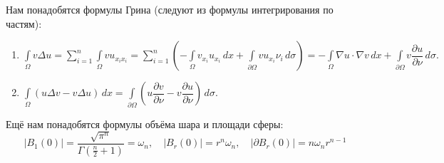 Нам понадобятся формулы Грина (следуют из формулы интегрирования по частям):
\begin{enumerate}
\item $\displaystyle \int \limits_\Omega v \Delta u = \sum \limits_{i = 1}^{n} \int \limits_\Omega v u_{x_i x_i} = \sum \limits_{i = 1}^{n} \left( - \int \limits_\Omega v_{x_i} u_{x_i} \, dx + \int \limits_{\partial \Omega} v u_{x_i} \nu_i \, d\sigma \right) = - \int \limits_\Omega \nabla u \cdot \nabla v \, dx + \int \limits_{\partial \Omega} v \dfrac{\partial u}{\partial \nu} \, d\sigma.$
\item $\displaystyle \int \limits_{\Omega} \left( u \Delta v - v \Delta u \right) \, dx = \int \limits_{\partial \Omega} \left( u \dfrac{\partial v}{\partial \nu} - v \dfrac{\partial u}{\partial \nu} \right) \, d\sigma.$
\end{enumerate}
Ещё нам понадобятся формулы объёма шара и площади сферы:
$$ |B_1(0)| = \frac{\sqrt{\pi^n}}{\Gamma(\frac {n} {2} + 1)} = \omega_n, \quad  |B_r(0)| = r^n \omega_n, \quad | \partial B_r(0) | = n \omega_n r^{n-1}$$

